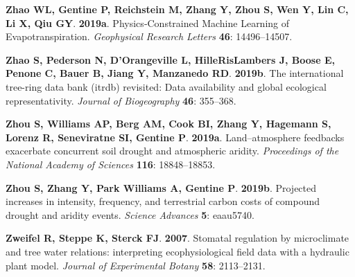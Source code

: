 \documentclass[11pt,twoside]{reedthesis}
\begin{document}
\hypertarget{ref-zhao_physicsconstrained_2019}{}
\textbf{\textnormal{Zhao WL}, \textnormal{Gentine P},
\textnormal{Reichstein M}, \textnormal{Zhang Y}, \textnormal{Zhou S},
\textnormal{Wen Y}, \textnormal{Lin C}, \textnormal{Li X},
\textnormal{Qiu GY}}. \textbf{2019a}. Physics‐Constrained Machine
Learning of Evapotranspiration. \emph{Geophysical Research Letters}
\textbf{46}: 14496--14507.

\hypertarget{ref-Zhao2019}{}
\textbf{\textnormal{Zhao S}, \textnormal{Pederson N},
\textnormal{D'Orangeville L}, \textnormal{HilleRisLambers J},
\textnormal{Boose E}, \textnormal{Penone C}, \textnormal{Bauer B},
\textnormal{Jiang Y}, \textnormal{Manzanedo RD}}. \textbf{2019b}. The
international tree-ring data bank (itrdb) revisited: Data availability
and global ecological representativity. \emph{Journal of Biogeography}
\textbf{46}: 355--368.

\hypertarget{ref-zhou_landatmosphere_2019}{}
\textbf{\textnormal{Zhou S}, \textnormal{Williams AP}, \textnormal{Berg
AM}, \textnormal{Cook BI}, \textnormal{Zhang Y}, \textnormal{Hagemann
S}, \textnormal{Lorenz R}, \textnormal{Seneviratne SI},
\textnormal{Gentine P}}. \textbf{2019a}. Land--atmosphere feedbacks
exacerbate concurrent soil drought and atmospheric aridity.
\emph{Proceedings of the National Academy of Sciences} \textbf{116}:
18848--18853.

\hypertarget{ref-zhou_projected_2019}{}
\textbf{\textnormal{Zhou S}, \textnormal{Zhang Y}, \textnormal{Park
Williams A}, \textnormal{Gentine P}}. \textbf{2019b}. Projected
increases in intensity, frequency, and terrestrial carbon costs of
compound drought and aridity events. \emph{Science Advances} \textbf{5}:
eaau5740.

\hypertarget{ref-Zweifel2007}{}
\textbf{\textnormal{Zweifel R}, \textnormal{Steppe K},
\textnormal{Sterck FJ}}. \textbf{2007}. Stomatal regulation by
microclimate and tree water relations: interpreting ecophysiological
field data with a hydraulic plant model. \emph{Journal of Experimental
Botany} \textbf{58}: 2113--2131.


\end{document}
